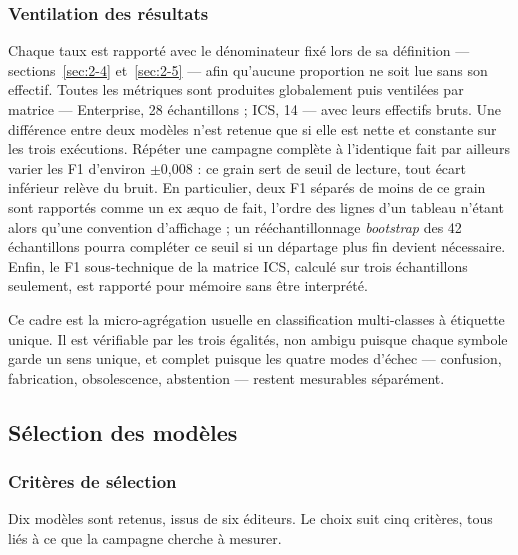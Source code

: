 \subsubsection{Ventilation des résultats}\label{sec:3-6}
Chaque taux est rapporté avec le dénominateur fixé lors de sa définition --- sections~\ref{sec:2-4} et~\ref{sec:2-5} --- afin qu'aucune proportion ne soit lue sans son effectif. Toutes les métriques sont produites globalement puis ventilées par matrice --- Enterprise, 28 échantillons ; ICS, 14 --- avec leurs effectifs bruts. Une différence entre deux modèles n'est retenue que si elle est nette et constante sur les trois exécutions. Répéter une campagne complète à l'identique fait par ailleurs varier les F1 d'environ $\pm$0,008 : ce grain sert de seuil de lecture, tout écart inférieur relève du bruit. En particulier, deux F1 séparés de moins de ce grain sont rapportés comme un ex æquo de fait, l'ordre des lignes d'un tableau n'étant alors qu'une convention d'affichage ; un rééchantillonnage \emph{bootstrap} des 42 échantillons pourra compléter ce seuil si un départage plus fin devient nécessaire. Enfin, le F1 sous-technique de la matrice ICS, calculé sur trois échantillons seulement, est rapporté pour mémoire sans être interprété.

Ce cadre est la micro-agrégation usuelle en classification multi-classes à étiquette unique. Il est vérifiable par les trois égalités, non ambigu puisque chaque symbole garde un sens unique, et complet puisque les quatre modes d'échec --- confusion, fabrication, obsolescence, abstention --- restent mesurables séparément.

\FloatBarrier
\subsection{Sélection des modèles}\label{sec:meth-modeles}

\subsubsection{Critères de sélection}\label{sec:4-1}
Dix modèles sont retenus, issus de six éditeurs. Le choix suit cinq critères, tous liés à ce que la campagne cherche à mesurer.

